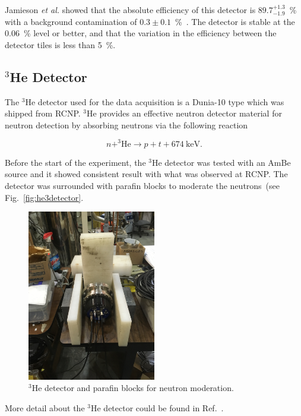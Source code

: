Jamieson {\it{et al.}} showed that the absolute efficiency of this
detector is $89.7^{+1.3}_{-1.9}$~\% with a background contamination of
$0.3 \pm 0.1$~\%~\cite{jamieson2017characterization}. The detector is
stable at the 0.06~\% level or better, and that the variation in the
efficiency between the detector tiles is less than 5~\%.
\subsection{$^3$He Detector}

The $^3$He detector used for the data acquisition is a Dunia-10 type
which was shipped from RCNP.  $^3$He provides an effective neutron
detector material for neutron detection by absorbing neutrons via the
following reaction

\begin{equation}
  \label{eqn:he3}
n + ^3\mathrm{He} \rightarrow p + t + 674~\mathrm{keV}.
\end{equation}

Before the start of the experiment, the $^3$He detector was tested
with an AmBe source and it showed consistent result with what was
observed at RCNP. The detector was surrounded with parafin blocks to
moderate the neutrons~(see Fig.~\ref{fig:he3detector}.

\begin{figure}[h]
  \centering
  \includegraphics[width=0.5\textwidth, angle = 270]{he3detector.png}
  \caption{$^3$He detector and parafin blocks for neutron
    moderation.}
  \label{fig:Li6detector}
\end{figure}

More detail about the $^3$He detector could be found in
Ref.~\cite{matsumiya_thesis}.

